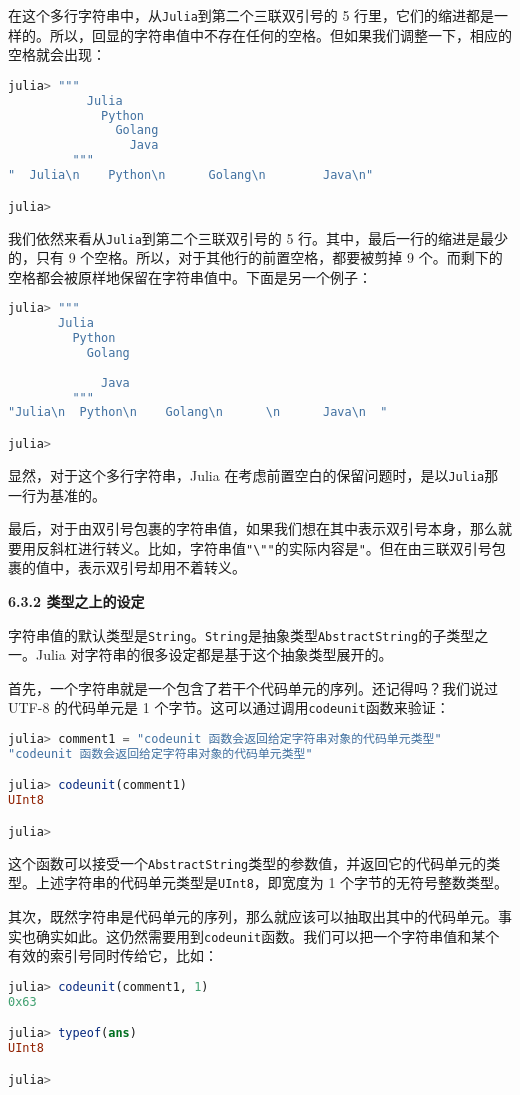 在这个多行字符串中，从\verb`Julia`到第二个三联双引号的 5 行里，它们的缩进都是一样的。所以，回显的字符串值中不存在任何的空格。但如果我们调整一下，相应的空格就会出现：
\begin{lstlisting}[language=julia]
julia> """
           Julia
             Python
               Golang
                 Java
         """
"  Julia\n    Python\n      Golang\n        Java\n"

julia> 
\end{lstlisting}

我们依然来看从\verb`Julia`到第二个三联双引号的 5 行。其中，最后一行的缩进是最少的，只有 9 个空格。所以，对于其他行的前置空格，都要被剪掉 9 个。而剩下的空格都会被原样地保留在字符串值中。下面是另一个例子：
\begin{lstlisting}[language=julia]
julia> """
       Julia
         Python
           Golang
             
             Java
         """
"Julia\n  Python\n    Golang\n      \n      Java\n  "

julia> 
\end{lstlisting}

显然，对于这个多行字符串，Julia 在考虑前置空白的保留问题时，是以\verb`Julia`那一行为基准的。

最后，对于由双引号包裹的字符串值，如果我们想在其中表示双引号本身，那么就要用反斜杠进行转义。比如，字符串值\verb`"\""`的实际内容是\verb`"`。但在由三联双引号包裹的值中，表示双引号却用不着转义。

\textbf{6.3.2 类型之上的设定}

字符串值的默认类型是\verb`String`。\verb`String`是抽象类型\verb`AbstractString`的子类型之一。Julia 对字符串的很多设定都是基于这个抽象类型展开的。

首先，一个字符串就是一个包含了若干个代码单元的序列。还记得吗？我们说过 UTF-8 的代码单元是 1 个字节。这可以通过调用\verb`codeunit`函数来验证：
\begin{lstlisting}[language=julia]
julia> comment1 = "codeunit 函数会返回给定字符串对象的代码单元类型"
"codeunit 函数会返回给定字符串对象的代码单元类型"

julia> codeunit(comment1)
UInt8

julia> 
\end{lstlisting}

这个函数可以接受一个\verb`AbstractString`类型的参数值，并返回它的代码单元的类型。上述字符串的代码单元类型是\verb`UInt8`，即宽度为 1 个字节的无符号整数类型。

其次，既然字符串是代码单元的序列，那么就应该可以抽取出其中的代码单元。事实也确实如此。这仍然需要用到\verb`codeunit`函数。我们可以把一个字符串值和某个有效的索引号同时传给它，比如：
\begin{lstlisting}[language=julia]
julia> codeunit(comment1, 1)
0x63

julia> typeof(ans)
UInt8

julia> 
\end{lstlisting}

